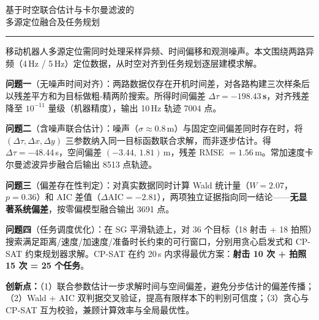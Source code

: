 \thispagestyle{abstractstyle}

\begin{center}
    \vspace*{0.5em}
    {\heiti{} 基于时空联合估计与卡尔曼滤波的\\[0.3em]多源定位融合及任务规划}\\[0.8em]
    \rule{0.5\linewidth}{0.6pt}
\end{center}

\abstracttitle

移动机器人多源定位需同时处理采样异频、时间偏移和观测噪声。本文围绕两路异频（4\,Hz / 5\,Hz）定位数据，从时空对齐到任务规划逐层建模求解。

\textbf{问题一}（无噪声时间对齐）：两路数据仅存在开机时间差，对各路构建三次样条后以残差平方和为目标做粗-精两阶搜索。所得时间偏差 \textbf{$\Delta\tau = -198.43$\,s}，对齐残差降至 $10^{-11}$ 量级（机器精度），输出 10\,Hz 轨迹 7004 点。

\textbf{问题二}（含噪声联合估计）：噪声（$\sigma \approx 0.8$\,m）与固定空间偏差同时存在时，将 $(\Delta\tau, \Delta x, \Delta y)$ 三参数纳入同一目标函数联合求解，而非逐步估计。得 $\Delta\tau = -48.44$\,s，空间偏差 $(-3.44,\, 1.81)$\,m，残差 RMSE $= 1.56$\,m。常加速度卡尔曼滤波异步融合后输出 8513 点轨迹。

\textbf{问题三}（偏差存在性判定）：对真实数据同时计算 Wald 统计量（$W = 2.07$，$p = 0.36$）和 AIC 差值（$\Delta\text{AIC} = -2.81$），两项独立证据指向同一结论——\textbf{无显著系统偏差}，按零偏模型融合输出 3691 点。

\textbf{问题四}（任务调度优化）：在 SG 平滑轨迹上，对 36 个目标（18 射击 + 18 拍照）搜索满足距离/速度/加速度/准备时长约束的可行窗口，分别用贪心启发式和 CP-SAT 约束规划器求解。CP-SAT 在约 20\,s 内求得最优方案：\textbf{射击 10 次 + 拍照 15 次 = 25 个任务}。

\textbf{创新点：}（1）联合参数估计一步求解时间与空间偏差，避免分步估计的偏差传播；（2）Wald + AIC 双判据交叉验证，提高有限样本下的判别可信度；（3）贪心与 CP-SAT 互为校验，兼顾计算效率与全局最优性。

